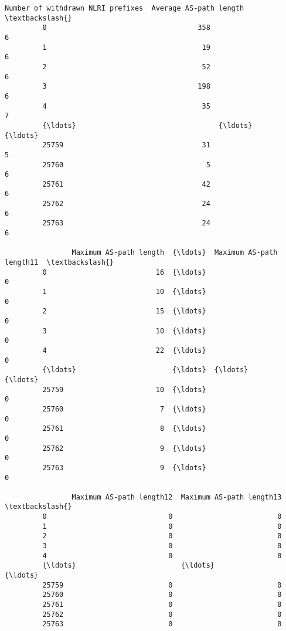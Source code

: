 \documentclass[11pt]{article}
\begin{document}
\begin{Verbatim}[commandchars=\\\{\}]
                Number of withdrawn NLRI prefixes  Average AS-path length  \textbackslash{}
         0                                    358                       6   
         1                                     19                       6   
         2                                     52                       6   
         3                                    198                       6   
         4                                     35                       7   
         {\ldots}                                  {\ldots}                     {\ldots}   
         25759                                 31                       5   
         25760                                  5                       6   
         25761                                 42                       6   
         25762                                 24                       6   
         25763                                 24                       6   
         
                Maximum AS-path length  {\ldots}  Maximum AS-path length11  \textbackslash{}
         0                          16  {\ldots}                         0   
         1                          10  {\ldots}                         0   
         2                          15  {\ldots}                         0   
         3                          10  {\ldots}                         0   
         4                          22  {\ldots}                         0   
         {\ldots}                       {\ldots}  {\ldots}                       {\ldots}   
         25759                      10  {\ldots}                         0   
         25760                       7  {\ldots}                         0   
         25761                       8  {\ldots}                         0   
         25762                       9  {\ldots}                         0   
         25763                       9  {\ldots}                         0   
         
                Maximum AS-path length12  Maximum AS-path length13  \textbackslash{}
         0                             0                         0   
         1                             0                         0   
         2                             0                         0   
         3                             0                         0   
         4                             0                         0   
         {\ldots}                         {\ldots}                       {\ldots}   
         25759                         0                         0   
         25760                         0                         0   
         25761                         0                         0   
         25762                         0                         0   
         25763                         0                         0   
         

\end{Verbatim}
\end{document}
